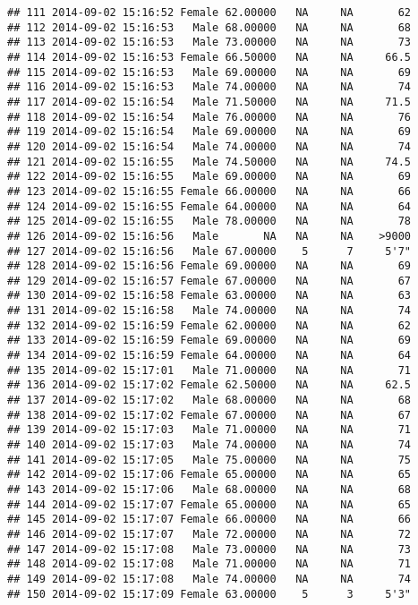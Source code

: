 \documentclass[
]{article}
\begin{document}
\begin{verbatim}
## 111 2014-09-02 15:16:52 Female 62.00000   NA     NA       62
## 112 2014-09-02 15:16:53   Male 68.00000   NA     NA       68
## 113 2014-09-02 15:16:53   Male 73.00000   NA     NA       73
## 114 2014-09-02 15:16:53 Female 66.50000   NA     NA     66.5
## 115 2014-09-02 15:16:53   Male 69.00000   NA     NA       69
## 116 2014-09-02 15:16:53   Male 74.00000   NA     NA       74
## 117 2014-09-02 15:16:54   Male 71.50000   NA     NA     71.5
## 118 2014-09-02 15:16:54   Male 76.00000   NA     NA       76
## 119 2014-09-02 15:16:54   Male 69.00000   NA     NA       69
## 120 2014-09-02 15:16:54   Male 74.00000   NA     NA       74
## 121 2014-09-02 15:16:55   Male 74.50000   NA     NA     74.5
## 122 2014-09-02 15:16:55   Male 69.00000   NA     NA       69
## 123 2014-09-02 15:16:55 Female 66.00000   NA     NA       66
## 124 2014-09-02 15:16:55 Female 64.00000   NA     NA       64
## 125 2014-09-02 15:16:55   Male 78.00000   NA     NA       78
## 126 2014-09-02 15:16:56   Male       NA   NA     NA    >9000
## 127 2014-09-02 15:16:56   Male 67.00000    5      7     5'7"
## 128 2014-09-02 15:16:56 Female 69.00000   NA     NA       69
## 129 2014-09-02 15:16:57 Female 67.00000   NA     NA       67
## 130 2014-09-02 15:16:58 Female 63.00000   NA     NA       63
## 131 2014-09-02 15:16:58   Male 74.00000   NA     NA       74
## 132 2014-09-02 15:16:59 Female 62.00000   NA     NA       62
## 133 2014-09-02 15:16:59 Female 69.00000   NA     NA       69
## 134 2014-09-02 15:16:59 Female 64.00000   NA     NA       64
## 135 2014-09-02 15:17:01   Male 71.00000   NA     NA       71
## 136 2014-09-02 15:17:02 Female 62.50000   NA     NA     62.5
## 137 2014-09-02 15:17:02   Male 68.00000   NA     NA       68
## 138 2014-09-02 15:17:02 Female 67.00000   NA     NA       67
## 139 2014-09-02 15:17:03   Male 71.00000   NA     NA       71
## 140 2014-09-02 15:17:03   Male 74.00000   NA     NA       74
## 141 2014-09-02 15:17:05   Male 75.00000   NA     NA       75
## 142 2014-09-02 15:17:06 Female 65.00000   NA     NA       65
## 143 2014-09-02 15:17:06   Male 68.00000   NA     NA       68
## 144 2014-09-02 15:17:07 Female 65.00000   NA     NA       65
## 145 2014-09-02 15:17:07 Female 66.00000   NA     NA       66
## 146 2014-09-02 15:17:07   Male 72.00000   NA     NA       72
## 147 2014-09-02 15:17:08   Male 73.00000   NA     NA       73
## 148 2014-09-02 15:17:08   Male 71.00000   NA     NA       71
## 149 2014-09-02 15:17:08   Male 74.00000   NA     NA       74
## 150 2014-09-02 15:17:09 Female 63.00000    5      3     5'3"
\end{verbatim}
\end{document}
